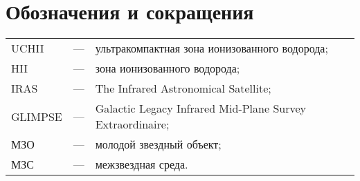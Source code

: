 \chapter*{Обозначения и сокращения}

\begin{tabular}{lcl}
  UCHII & --- & ультракомпактная зона ионизованного водорода; \\
  HII & --- &   зона ионизованного водорода; \\
  IRAS & --- & The Infrared Astronomical Satellite; \\
  GLIMPSE & --- & Galactic Legacy Infrared Mid-Plane Survey Extraordinaire; \\
  МЗО & --- & молодой звездный объект; \\
  МЗС & --- & межзвездная среда. \\
\end{tabular}
